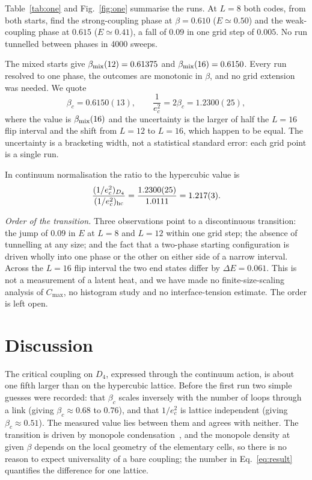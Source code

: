 \documentclass[aps,prd,twocolumn,superscriptaddress,floatfix,nofootinbib]{revtex4-2}
\begin{document}
Table~\ref{tab:one} and Fig.~\ref{fig:one} summarise the runs. At $L=8$ both codes, from both
starts, find the strong-coupling phase at $\beta=0.610$ ($E\simeq0.50$) and the weak-coupling
phase at $0.615$ ($E\simeq0.41$), a fall of $0.09$ in one grid step of $0.005$. No run
tunnelled between phases in 4000 sweeps.

The mixed starts give $\beta_{\rm mix}(12)=0.61375$ and $\beta_{\rm mix}(16)=0.6150$. Every
run resolved to one phase, the outcomes are monotonic in $\beta$, and no grid extension was
needed. We quote
\begin{equation}
\beta_c=0.6150(13),\qquad \frac{1}{e_c^2}=2\beta_c=1.2300(25),
\label{eq:result}
\end{equation}
where the value is $\beta_{\rm mix}(16)$ and the uncertainty is the larger of half the $L=16$
flip interval and the shift from $L=12$ to $L=16$, which happen to be equal. The uncertainty
is a bracketing width, not a statistical standard error: each grid point is a single run.

In continuum normalisation the ratio to the hypercubic value is
\begin{equation}
\frac{(1/e_c^2)_{D_4}}{(1/e_c^2)_{\rm hc}}=\frac{1.2300(25)}{1.0111}=1.217(3).
\end{equation}

\emph{Order of the transition.} Three observations point to a discontinuous transition:
the jump of $0.09$ in $E$ at $L=8$ and $L=12$ within one grid step; the absence of tunnelling
at any size; and the fact that a two-phase starting configuration is driven wholly into one phase or
the other on either side of a narrow interval. Across the $L=16$ flip interval the two end
states differ by $\Delta E=0.061$. This is not a measurement of a latent heat, and we have
made no finite-size-scaling analysis of $C_{\max}$, no histogram study and no interface-tension
estimate. The order is left open.

\section{Discussion}

The critical coupling on $D_4$, expressed through the continuum action, is about one fifth
larger than on the hypercubic lattice. Before the first run two simple guesses were recorded:
that $\beta_c$ scales inversely with the number of loops through a link (giving
$\beta_c\approx0.68$ to $0.76$), and that $1/e_c^2$ is lattice independent (giving
$\beta_c\approx0.51$). The measured value lies between them and agrees with neither.
The transition is driven by monopole condensation~\cite{BMK1977}, and the monopole density at
given $\beta$ depends on the local geometry of the elementary cells, so there is no reason to
expect universality of a bare coupling; the number in Eq.~\eqref{eq:result} quantifies the
difference for one lattice.
\end{document}
